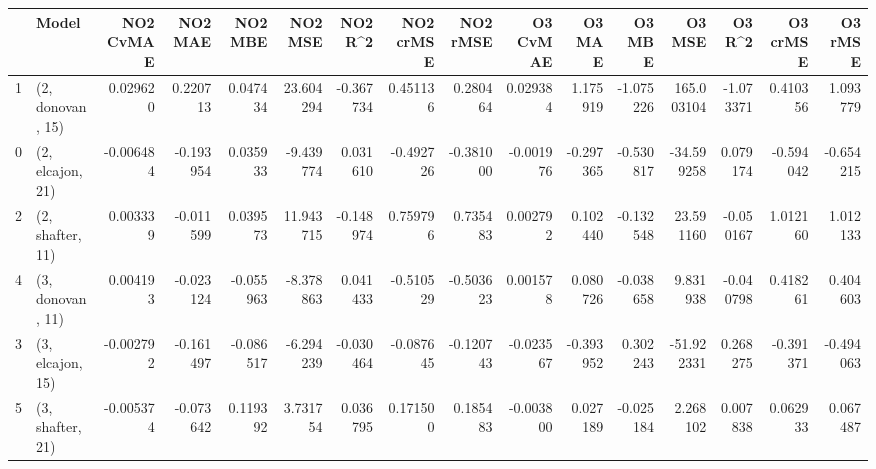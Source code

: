 \begin{tabular}{llrrrrrrrrrrrrrr}
\toprule
{} &             Model &  NO2 CvMAE &   NO2 MAE &   NO2 MBE &    NO2 MSE &   NO2 R\textasciicircum2 &  NO2 crMSE &  NO2 rMSE &  O3 CvMAE &    O3 MAE &    O3 MBE &      O3 MSE &    O3 R\textasciicircum2 &  O3 crMSE &   O3 rMSE \\
\midrule
1 &  (2, donovan, 15) &   0.029620 &  0.220713 &  0.047434 &  23.604294 & -0.367734 &   0.451136 &  0.280464 &  0.029384 &  1.175919 & -1.075226 &  165.003104 & -1.073371 &  0.410356 &  1.093779 \\
0 &  (2, elcajon, 21) &  -0.006484 & -0.193954 &  0.035933 &  -9.439774 &  0.031610 &  -0.492726 & -0.381000 & -0.001976 & -0.297365 & -0.530817 &  -34.599258 &  0.079174 & -0.594042 & -0.654215 \\
2 &  (2, shafter, 11) &   0.003339 & -0.011599 &  0.039573 &  11.943715 & -0.148974 &   0.759796 &  0.735483 &  0.002792 &  0.102440 & -0.132548 &   23.591160 & -0.050167 &  1.012160 &  1.012133 \\
4 &  (3, donovan, 11) &   0.004193 & -0.023124 & -0.055963 &  -8.378863 &  0.041433 &  -0.510529 & -0.503623 &  0.001578 &  0.080726 & -0.038658 &    9.831938 & -0.040798 &  0.418261 &  0.404603 \\
3 &  (3, elcajon, 15) &  -0.002792 & -0.161497 & -0.086517 &  -6.294239 & -0.030464 &  -0.087645 & -0.120743 & -0.023567 & -0.393952 &  0.302243 &  -51.922331 &  0.268275 & -0.391371 & -0.494063 \\
5 &  (3, shafter, 21) &  -0.005374 & -0.073642 &  0.119392 &   3.731754 &  0.036795 &   0.171500 &  0.185483 & -0.003800 &  0.027189 & -0.025184 &    2.268102 &  0.007838 &  0.062933 &  0.067487 \\
\bottomrule
\end{tabular}
